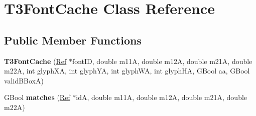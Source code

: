 \hypertarget{class_t3_font_cache}{}\section{T3\+Font\+Cache Class Reference}
\label{class_t3_font_cache}
\subsection*{Public Member Functions}
\begin{DoxyCompactItemize}
\item 
\mbox{\label{class_t3_font_cache_ab13e10ee80dfc7414cc25e0b469b2c01}} 
{\bfseries T3\+Font\+Cache} (\hyperlink{struct_ref}{Ref} $\ast$font\+ID, double m11A, double m12A, double m21A, double m22A, int glyph\+XA, int glyph\+YA, int glyph\+WA, int glyph\+HA, G\+Bool aa, G\+Bool valid\+B\+BoxA)
\item 
\mbox{\label{class_t3_font_cache_a7df2b556865dda45eb684bb1740c94ac}} 
G\+Bool {\bfseries matches} (\hyperlink{struct_ref}{Ref} $\ast$idA, double m11A, double m12A, double m21A, double m22A)
\end{DoxyCompactItemize}
